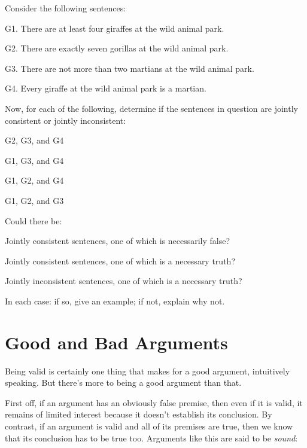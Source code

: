 \problempart
\label{pr.MartianGiraffes}
Consider the following sentences:

	\begin{ebullet}
		\item[G1.] There are at least four giraffes at the wild animal park.
		\item[G2.] There are exactly seven gorillas at the wild animal park.
		\item[G3.] There are not more than two martians at the wild animal park.
		\item[G4.] Every giraffe at the wild animal park is a martian.
	\end{ebullet}
	
Now, for each of the following, determine if the sentences in question are jointly consistent or jointly inconsistent:

\begin{earg}
\item G2, G3, and G4
\item G1, G3, and G4
\item G1, G2, and G4
\item G1, G2, and G3
\end{earg}


\problempart
Could there be:
	\begin{earg}
		\item Jointly consistent sentences, one of which is necessarily false?
		\item Jointly consistent sentences, one of which is a necessary truth?
		\item Jointly inconsistent sentences, one of which is a necessary truth?
	\end{earg}
In each case: if so, give an example; if not, explain why not.




\section{Good and Bad Arguments}\label{s:GoodBadArg}

Being valid is certainly one thing that makes for a good argument, intuitively speaking.  But there's more to being a good argument than that.

First off, if an argument has an obviously false premise, then even if it is valid, it remains of limited interest because it doesn't establish its conclusion.  By contrast, if an argument is valid and all of its premises are true, then we know that its conclusion has to be true too.  Arguments like this are said to be \emph{sound}:

